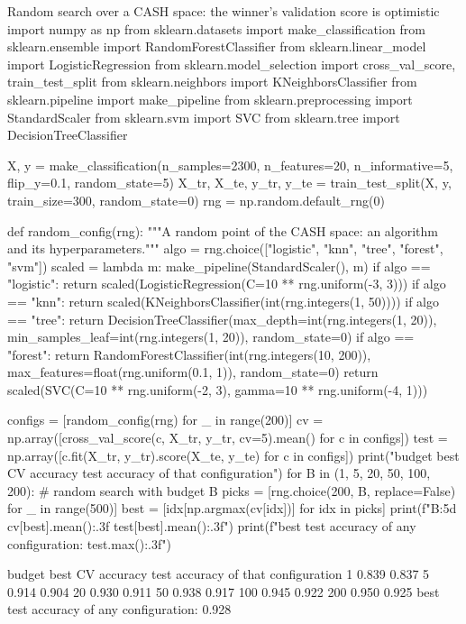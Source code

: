 \begin{pylisting}[label={lst:cash}]{Random search over a CASH space: the winner's validation score is optimistic}
import numpy as np
from sklearn.datasets import make_classification
from sklearn.ensemble import RandomForestClassifier
from sklearn.linear_model import LogisticRegression
from sklearn.model_selection import cross_val_score, train_test_split
from sklearn.neighbors import KNeighborsClassifier
from sklearn.pipeline import make_pipeline
from sklearn.preprocessing import StandardScaler
from sklearn.svm import SVC
from sklearn.tree import DecisionTreeClassifier

X, y = make_classification(n_samples=2300, n_features=20, n_informative=5, flip_y=0.1,
                           random_state=5)
X_tr, X_te, y_tr, y_te = train_test_split(X, y, train_size=300, random_state=0)
rng = np.random.default_rng(0)

def random_config(rng):
    """A random point of the CASH space: an algorithm and its hyperparameters."""
    algo = rng.choice(["logistic", "knn", "tree", "forest", "svm"])
    scaled = lambda m: make_pipeline(StandardScaler(), m)
    if algo == "logistic":
        return scaled(LogisticRegression(C=10 ** rng.uniform(-3, 3)))
    if algo == "knn":
        return scaled(KNeighborsClassifier(int(rng.integers(1, 50))))
    if algo == "tree":
        return DecisionTreeClassifier(max_depth=int(rng.integers(1, 20)),
                                      min_samples_leaf=int(rng.integers(1, 20)),
                                      random_state=0)
    if algo == "forest":
        return RandomForestClassifier(int(rng.integers(10, 200)),
                                      max_features=float(rng.uniform(0.1, 1)),
                                      random_state=0)
    return scaled(SVC(C=10 ** rng.uniform(-2, 3), gamma=10 ** rng.uniform(-4, 1)))

configs = [random_config(rng) for _ in range(200)]
cv = np.array([cross_val_score(c, X_tr, y_tr, cv=5).mean() for c in configs])
test = np.array([c.fit(X_tr, y_tr).score(X_te, y_te) for c in configs])
print("budget  best CV accuracy  test accuracy of that configuration")
for B in (1, 5, 20, 50, 100, 200):          # random search with budget B
    picks = [rng.choice(200, B, replace=False) for _ in range(500)]
    best = [idx[np.argmax(cv[idx])] for idx in picks]
    print(f"{B:5d}       {cv[best].mean():.3f}              {test[best].mean():.3f}")
print(f"best test accuracy of any configuration: {test.max():.3f}")
\end{pylisting}
\begin{pyoutput}
budget  best CV accuracy  test accuracy of that configuration
    1       0.839              0.837
    5       0.914              0.904
   20       0.930              0.911
   50       0.938              0.917
  100       0.945              0.922
  200       0.950              0.925
best test accuracy of any configuration: 0.928
\end{pyoutput}

